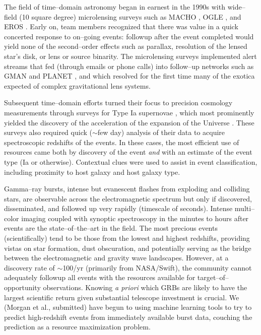\smallskip

The field of time--domain astronomy began in earnest in the 1990s with
wide--field (10 square degree) microlensing surveys such as MACHO
\citep{2000ApJ...542..281A}, OGLE \citep{1994AcA....44..227U}, and EROS
\citep{2003A&A...400..951A}.   Early on, team members recognized that there was
value in a quick concerted response to on--going events: followup after the
event completed would yield none of the second--order effects such as parallax,
resolution of the lensed star's disk, or lens or source binarity.  The
microlensing surveys implemented alert streams that fed (through emails or phone
calls) into follow--up networks such as GMAN \citep{2000PhDT.......258B} and
PLANET \citep{1998ApJ...509..687A}, and which resolved for the first time many
of the exotica expected of complex gravitational lens systems.

Subsequent time--domain efforts turned their focus to precision cosmology
measurements through surveys for Type Ia supernovae \citep{1996AJ....112.2398H},
which most prominently yielded the discovery of the acceleration of the
expansion of the Universe \citep{1998AJ....116.1009R,1999ApJ...517..565P}. These
surveys also required quick ($\sim$few day) analysis of their data to acquire
spectroscopic redshifts of the events. In these cases, the most efficient use of
resources came both by discovery of the event {\it and} with an estimate of the
event type (Ia or otherwise).  Contextual clues were used to assist in event
classification, including proximity to host galaxy and host galaxy type.

Gamma--ray bursts, intense but evanescent flashes from exploding and colliding
stars, are observable across the electromagnetic spectrum but only if
discovered, disseminated, and followed up very rapidly (timescale of seconds).
Intense multi--color imaging coupled with synoptic spectroscopy in the minutes
to hours after events are the state--of--the--art in the field. The most
precious events (scientifically) tend to be those from the lowest and highest
redshifts, providing vistas on star formation, dust obscuration, and potentially
serving as the bridge between the electromagnetic and gravity wave landscapes.
However, at a discovery rate of $\sim$100/yr (primarily from NASA/Swift), the
community cannot adequately followup all events with the resources available for
target--of--opportunity observations. Knowing {\it a priori} which GRBs are
likely to have the largest scientific return given substantial telescope
investment is crucial. We (Morgan et al., submitted) have begun to using machine
learning tools to try to predict high-redshift events from immediately available
burst data, couching the prediction as a resource maximization problem.

